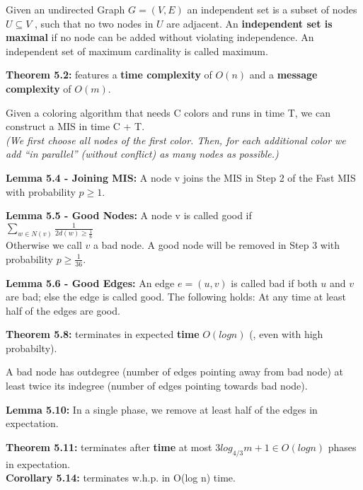 {
	Given an undirected Graph $G = (V, E)$ an independent set is a subset of nodes
	$U \subseteq V$ , such that no two nodes in $U$ are adjacent. An
	{\bf independent set is maximal} if no node can be added without violating
	independence. An independent set of maximum cardinality is called maximum.
}

{
	\begin{items}
		\item {\bf Theorem 5.2:} features a {\bf time complexity} of $O(n)$ and
		a {\bf message complexity} of $O(m)$.
	\end{items}
}

{
	Given a coloring algorithm that needs C colors and runs in time T, we can
	construct a MIS in time C + T.\\
	{\it (We first choose all nodes of the first color. Then, for each additional
	color we add ``in parallel'' (without conflict) as many nodes as possible.)}
}

{
	\begin{items}
		\item {\bf Lemma 5.4 - Joining MIS:} A node v joins the MIS in Step 2 of the
		Fast MIS with probability $p \geq 1$.
		\item {\bf Lemma 5.5 - Good Nodes:} A node v is called good if\\
		$\sum_{w\in N(v)} \frac{1}{2d(w) \geq \frac{1}{6}}$\\
		Otherwise we call $v$ a bad node. A good node will be removed in Step 3 with
		probability $p \geq \frac{1}{36}$.
		\item {\bf Lemma 5.6 - Good Edges:} An edge $e = (u, v)$ is called bad if both
		$u$ and $v$ are bad; else the edge is called good. The following holds: At any
		time at least half of the edges are good.
		\item {\bf Theorem 5.8:} terminates in expected {\bf time} $O(log n)$ (, even
		with high probabilty).
	\end{items}	
}

{
	A bad node has outdegree (number of edges pointing away from bad node) at least
	twice its indegree (number of edges pointing towards bad node).
}

{
	\begin{items}
		\item {\bf Lemma 5.10:} In a single phase, we remove at least half of the
		edges in expectation.
		\item {\bf Theorem 5.11:} terminates after {\bf time} at most $3 log_{4/3} m +
		1 \in O(log n)$ phases in expectation.\\
		{\bf Corollary 5.14:} terminates w.h.p. in O(log n) time.
	\end{items}
}

